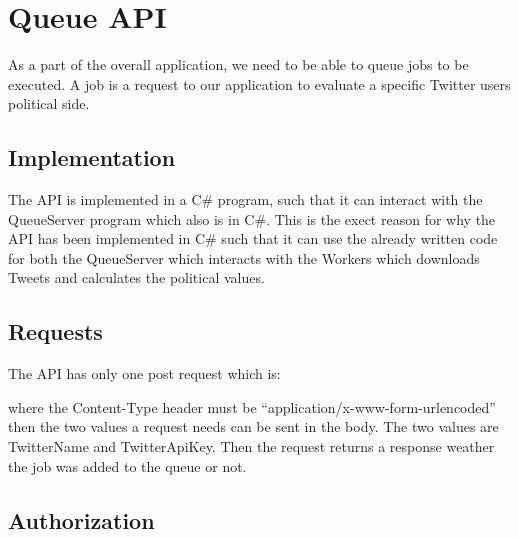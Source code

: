 \chapter{Queue \ac{API}}
As a part of the overall application, we need to be able to queue jobs to be
executed. A job is a request to our application to evaluate a specific Twitter
users political side.

\section{Implementation}
The \ac{API} is implemented in a C\# program, such that it can interact with the
QueueServer program which also is in C\#. This is the exect reason for why the
\ac{API} has been implemented in C\# such that it can use the already written
code for both the QueueServer which interacts with the Workers which downloads
Tweets and calculates the political values.


\section{Requests}
The \ac{API} has only one post request which is: \nl

\nl

where the Content-Type header must be ``application/x-www-form-urlencoded''
then the two values a request needs can be sent in the body. The two values are
TwitterName and TwitterApiKey.
Then the request returns a response weather the job was added to the queue or
not.

\section{Authorization}



